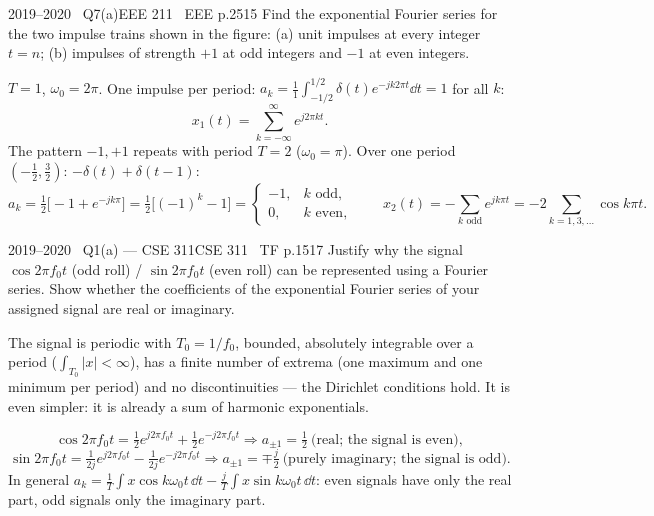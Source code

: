 \begin{qcard}{2019--2020 \textbullet\ Q7(a)}{EEE 211 \textbullet\ EEE p.25}{15}
Find the exponential Fourier series for the two impulse trains shown in the figure: (a) unit impulses at every integer $t=n$; (b) impulses of strength $+1$ at odd integers and $-1$ at even integers.
\end{qcard}
\begin{solution}
 $T=1$, $\omega_0=2\pi$. One impulse per period: $a_k=\frac11\int_{-1/2}^{1/2}\delta(t)e^{-jk2\pi t}\dd t=1$ for all $k$:
\[x_1(t)=\sum_{k=-\infty}^{\infty}e^{j2\pi kt}.\]
 The pattern $-1,+1$ repeats with period $T=2$ ($\omega_0=\pi$). Over one period $(-\frac12,\frac32)$: $-\delta(t)+\delta(t-1)$:
\[a_k=\tfrac12\big[-1+e^{-jk\pi}\big]=\tfrac12\big[(-1)^k-1\big]=\begin{cases}-1,&k\text{ odd},\\0,&k\text{ even},\end{cases}
\qquad x_2(t)=-\sum_{k\text{ odd}}e^{jk\pi t}=-2\sum_{k=1,3,\dots}\cos k\pi t .\]
\end{solution}

\begin{qcard}{2019--2020 \textbullet\ Q1(a) --- CSE 311}{CSE 311 \textbullet\ TF p.15}{17}
Justify why the signal $\cos2\pi f_0t$ (odd roll) / $\sin2\pi f_0t$ (even roll) can be represented using a Fourier series. Show whether the coefficients of the exponential Fourier series of your assigned signal are real or imaginary.
\end{qcard}
\begin{solution}
 The signal is periodic with $T_0=1/f_0$, bounded, absolutely integrable over a period ($\int_{T_0}|x|<\infty$), has a finite number of extrema (one maximum and one minimum per period) and no discontinuities --- the Dirichlet conditions hold. It is even simpler: it is already a sum of harmonic exponentials.

\[\cos2\pi f_0t=\tfrac12e^{j2\pi f_0t}+\tfrac12e^{-j2\pi f_0t}\Rightarrow a_{\pm1}=\tfrac12\ \text{(real; the signal is even)},\]
\[\sin2\pi f_0t=\tfrac1{2j}e^{j2\pi f_0t}-\tfrac1{2j}e^{-j2\pi f_0t}\Rightarrow a_{\pm1}=\mp\tfrac j2\ \text{(purely imaginary; the signal is odd)}.\]
In general $a_k=\frac1T\int x\cos k\omega_0t\,\dd t-\frac jT\int x\sin k\omega_0t\,\dd t$: even signals have only the real part, odd signals only the imaginary part.
\end{solution}

